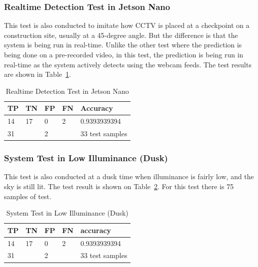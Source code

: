 \subsubsection{Realtime Detection Test in Jetson Nano}
\label{subsubsec:hedect_test_cctv_jetsonanno}

\par This test is also conducted to imitate how CCTV is placed at a checkpoint on a construction site, usually at a 45-degree angle. But the difference is that the system is being run in real-time. Unlike the other test where the prediction is being done on a pre-recorded video, in this test, the prediction is being run in real-time as the system actively detects using the webcam feeds. The test results are shown in Table~\ref{tb:systest_jetsonnano}.

\begin{table}
  \centering
  \caption{Realtime Detection Test in Jetson Nano}
  \label{tb:systest_jetsonnano}
  \begin{tabular}{|l|l|l|l|l|} 
  \hline
  TP & TN                    & FP & FN                & Accuracy         \\ 
  \hline
  14 & 17                    & 0  & 2                 & 0.9393939394     \\ 
  \hline
  \multicolumn{2}{|l|}{31}   & \multicolumn{2}{l|}{2} & 33 test samples  \\
  \hline
  \end{tabular}
\end{table}

\subsubsection{System Test in Low Illuminance (Dusk)}
\label{subsubsec:hedect_test_lowillum_dusk}

\par This test is also conducted at a dusk time when illuminance is fairly low, and the sky is still lit. The test result is shown on Table~\ref{tb:systest_lowillum_dusk}. For this test there is 75 samples of test.

\begin{table}
  \centering
  \caption{System Test in Low Illuminance (Dusk)}
  \label{tb:systest_lowillum_dusk}
  \begin{tabular}{|l|l|l|l|l|} 
  \hline
  TP & TN                    & FP & FN                & accuracy         \\ 
  \hline
  14 & 17                    & 0  & 2                 & 0.9393939394     \\ 
  \hline
  \multicolumn{2}{|l|}{31}   & \multicolumn{2}{l|}{2} & 33 test samples  \\
  \hline
  \end{tabular}
\end{table}

